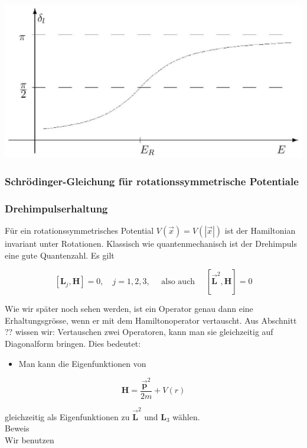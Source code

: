 \documentclass[10pt, letterpaper]{article}
\begin{document}
\begin{center}
\includegraphics[scale=0.2]{2025_05_21_d5590f158a899e385c7cg-22}
\end{center}






\pagebreak


\subsubsection*{Schrödinger-Gleichung für rotationssymmetrische Potentiale}

\subsubsection*{Drehimpulserhaltung}
Für ein rotationssymmetrisches Potential $V(\vec{x})=V(|\vec{x}|)$ ist der Hamiltonian invariant unter Rotationen. Klassisch wie quantenmechanisch ist der Drehimpuls eine gute Quantenzahl. Es gilt

$$
\left[\mathbf{L}_{j}, \mathbf{H}\right]=0, \quad j=1,2,3, \quad \text { also auch } \quad\left[\overrightarrow{\mathbf{L}}^{2}, \mathbf{H}\right]=0
$$

Wie wir später noch sehen werden, ist ein Operator genau dann eine Erhaltungsgrösse, wenn er mit dem Hamiltonoperator vertauscht. Aus Abschnitt ?? wissen wir: Vertauschen zwei Operatoren, kann man sie gleichzeitig auf Diagonalform bringen. Dies bedeutet:

\begin{itemize}
  \item Man kann die Eigenfunktionen von
\end{itemize}

$$
\mathbf{H}=\frac{\overrightarrow{\mathbf{p}}^{2}}{2 m}+V(r)
$$

gleichzeitig als Eigenfunktionen zu $\overrightarrow{\mathbf{L}}^{2}$ und $\mathbf{L}_{3}$ wählen.\\
Beweis\\
Wir benutzen
\end{document}
